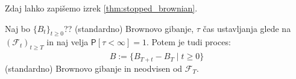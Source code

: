 \documentclass[11pt]{article}
\newcommand{\f}{\mathcal{F}}
\begin{document}
    Zdaj lahko zapišemo izrek \ref{thm:stopped_brownian}. %
    
    \begin{izrek}
        \label{thm:stopped_brownian}
    Naj bo $\{B_t\}_{t \geq 0}$?? (standardno) Brownovo gibanje, $\tau$ čas ustavljanja glede na 
    $(\f_t)_{t \geq T}$ in naj velja $\mathsf{P} [\tau < \infty]=1$.
    Potem je tudi proces:
    \[
    \hat{B} := \{B_{T+t} - B_T \mid t \geq 0\}
    \]
    (standardno) Brownovo gibanje in neodvisen od $\f_T$.
    \end{izrek}
  
    
    
\end{document}
